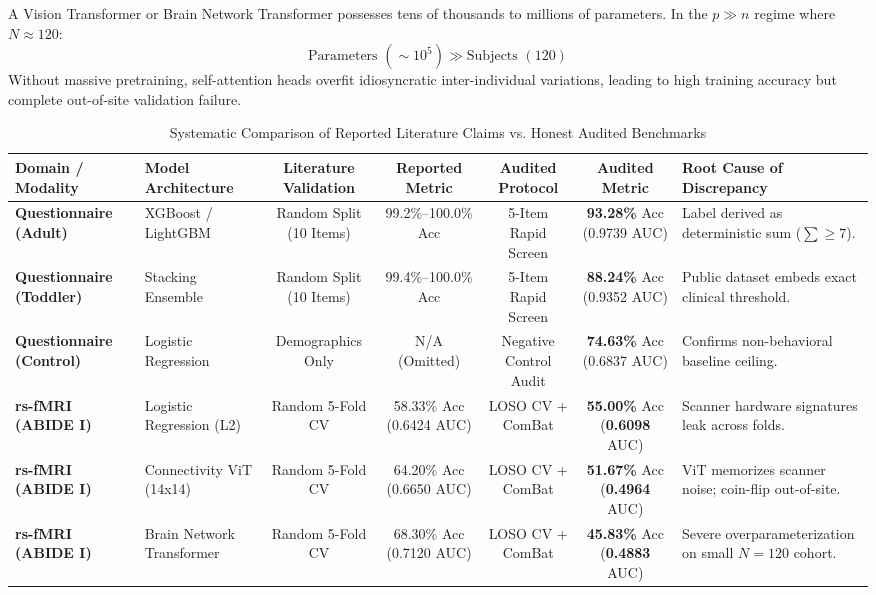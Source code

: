 \documentclass[journal]{IEEEtran}
\begin{document}
A Vision Transformer or Brain Network Transformer possesses tens of thousands to millions of parameters. In the $p \gg n$ regime where $N \approx 120$:
\begin{equation}
\text{Parameters } (\sim 10^5) \gg \text{Subjects } (120)
\end{equation}
Without massive pretraining, self-attention heads overfit idiosyncratic inter-individual variations, leading to high training accuracy but complete out-of-site validation failure.

\begin{table}[t]
\centering
\caption{Systematic Comparison of Reported Literature Claims vs. Honest Audited Benchmarks}
\label{tab:meta_synthesis}
\begin{tabular}{llccccp{5.5cm}}
\toprule
\textbf{Domain / Modality} & \textbf{Model Architecture} & \textbf{Literature Validation} & \textbf{Reported Metric} & \textbf{Audited Protocol} & \textbf{Audited Metric} & \textbf{Root Cause of Discrepancy} \\
\midrule
\textbf{Questionnaire (Adult)} & XGBoost / LightGBM & Random Split (10 Items) & 99.2\%--100.0\% Acc & 5-Item Rapid Screen & \textbf{93.28\%} Acc (0.9739 AUC) & Label derived as deterministic sum ($\sum \ge 7$). \\
\textbf{Questionnaire (Toddler)} & Stacking Ensemble & Random Split (10 Items) & 99.4\%--100.0\% Acc & 5-Item Rapid Screen & \textbf{88.24\%} Acc (0.9352 AUC) & Public dataset embeds exact clinical threshold. \\
\textbf{Questionnaire (Control)} & Logistic Regression & Demographics Only & N/A (Omitted) & Negative Control Audit & \textbf{74.63\%} Acc (0.6837 AUC) & Confirms non-behavioral baseline ceiling. \\
\midrule
\textbf{rs-fMRI (ABIDE I)} & Logistic Regression (L2) & Random 5-Fold CV & 58.33\% Acc (0.6424 AUC) & LOSO CV + ComBat & \textbf{55.00\%} Acc (\textbf{0.6098} AUC) & Scanner hardware signatures leak across folds. \\
\textbf{rs-fMRI (ABIDE I)} & Connectivity ViT (14x14) & Random 5-Fold CV & 64.20\% Acc (0.6650 AUC) & LOSO CV + ComBat & \textbf{51.67\%} Acc (\textbf{0.4964} AUC) & ViT memorizes scanner noise; coin-flip out-of-site. \\
\textbf{rs-fMRI (ABIDE I)} & Brain Network Transformer & Random 5-Fold CV & 68.30\% Acc (0.7120 AUC) & LOSO CV + ComBat & \textbf{45.83\%} Acc (\textbf{0.4883} AUC) & Severe overparameterization on small $N=120$ cohort. \\

\end{tabular}
\end{table}
\end{document}
